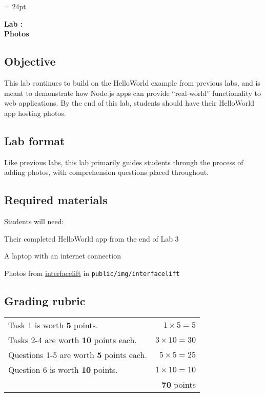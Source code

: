 \documentclass{article}
\begin{document}
\chead{\textcolor{Gray}{CSSE491 -- Scalable Computing Lab Assignment}}
\headsep = 24pt

\begin{center}
{ \large
\textbf{Lab \labnumber: \longproductname} \\
\textbf{Photos}
}
\end{center}

\subsection*{Objective}
This lab continues to build on the HelloWorld example from previous labs, and is meant to demonstrate how Node.js apps can provide ``real-world'' functionality to web applications. By the end of this lab, students should have their HelloWorld app hosting photos.

\subsection*{Lab format}
Like previous labs, this lab primarily guides students through the process of adding photos, with comprehension questions placed throughout.

\subsection*{Required materials}
Students will need:
\begin{itemize*}
\item Their completed HelloWorld app from the end of Lab 3
\item A laptop with an internet connection
\item Photos from \href{http://interfacelift.com}{interfacelift} in \verb!public/img/interfacelift!
\end{itemize*}


\subsection*{Grading rubric}
\begin{tabular}{p{5.5in} r}
Task 1 is worth \textbf{5} points. & $1 \times 5 = 5$ \\
Tasks 2-4 are worth \textbf{10} points each. & $3 \times 10 = 30$ \\
Questions 1-5 are worth \textbf{5} points each. & $5 \times 5 = 25$ \\
Question 6 is worth \textbf{10} points. & $1 \times 10 = 10$ \\ \hline
& \textbf{70} points
\end{tabular}
\end{document}
